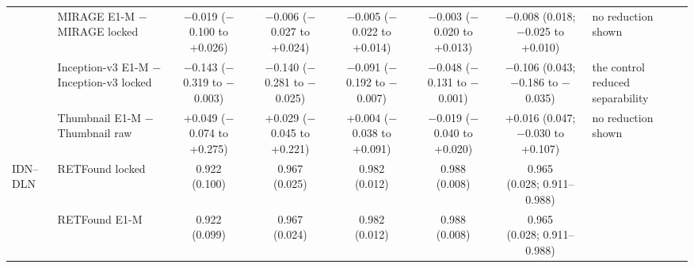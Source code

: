 \begin{longtable}{@{}llcccccp{3cm}@{}}
 & MIRAGE E1-M $-$ MIRAGE locked & \makecell{$-$0.019\\{\scriptsize ($-$0.100 to +0.026)}} & \makecell{$-$0.006\\{\scriptsize ($-$0.027 to +0.024)}} & \makecell{$-$0.005\\{\scriptsize ($-$0.022 to +0.014)}} & \makecell{$-$0.003\\{\scriptsize ($-$0.020 to +0.013)}} & \makecell{$-$0.008\\{\scriptsize (0.018; $-$0.025 to +0.010)}} & no reduction shown \\
 & Inception-v3 E1-M $-$ Inception-v3 locked & \makecell{$-$0.143\\{\scriptsize ($-$0.319 to $-$0.003)}} & \makecell{$-$0.140\\{\scriptsize ($-$0.281 to $-$0.025)}} & \makecell{$-$0.091\\{\scriptsize ($-$0.192 to $-$0.007)}} & \makecell{$-$0.048\\{\scriptsize ($-$0.131 to $-$0.001)}} & \makecell{$-$0.106\\{\scriptsize (0.043; $-$0.186 to $-$0.035)}} & the control reduced separability \\
 & Thumbnail E1-M $-$ Thumbnail raw & \makecell{+0.049\\{\scriptsize ($-$0.074 to +0.275)}} & \makecell{+0.029\\{\scriptsize ($-$0.045 to +0.221)}} & \makecell{+0.004\\{\scriptsize ($-$0.038 to +0.091)}} & \makecell{$-$0.019\\{\scriptsize ($-$0.040 to +0.020)}} & \makecell{+0.016\\{\scriptsize (0.047; $-$0.030 to +0.107)}} & no reduction shown \\
\addlinespace[2pt]
IDN--DLN & RETFound locked & \makecell{0.922\\{\scriptsize (0.100)}} & \makecell{0.967\\{\scriptsize (0.025)}} & \makecell{0.982\\{\scriptsize (0.012)}} & \makecell{0.988\\{\scriptsize (0.008)}} & \makecell{0.965\\{\scriptsize (0.028; 0.911--0.988)}} &  \\
 & RETFound E1-M & \makecell{0.922\\{\scriptsize (0.099)}} & \makecell{0.967\\{\scriptsize (0.024)}} & \makecell{0.982\\{\scriptsize (0.012)}} & \makecell{0.988\\{\scriptsize (0.008)}} & \makecell{0.965\\{\scriptsize (0.028; 0.911--0.988)}} &  \\

\end{longtable}
